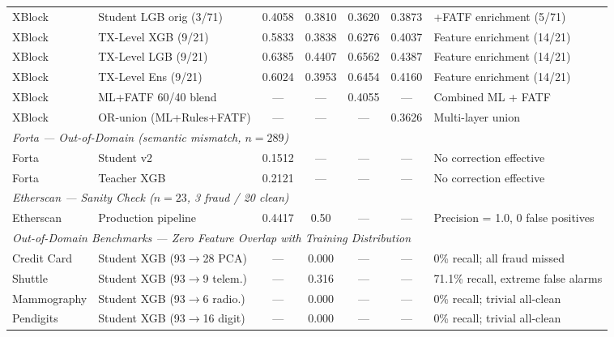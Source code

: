 \documentclass[journal]{IEEEtran}
\begin{document}
\begin{table}[!t]
\begin{tabular}{llccccl}
XBlock & Student LGB orig (3/71)       & 0.4058 & 0.3810 & 0.3620 & 0.3873 & +FATF enrichment (5/71) \\
XBlock & TX-Level XGB (9/21)           & 0.5833 & 0.3838 & 0.6276 & 0.4037 & Feature enrichment (14/21) \\
XBlock & TX-Level LGB (9/21)           & 0.6385 & 0.4407 & 0.6562 & 0.4387 & Feature enrichment (14/21) \\
XBlock & TX-Level Ens (9/21)           & 0.6024 & 0.3953 & 0.6454 & 0.4160 & Feature enrichment (14/21) \\
XBlock & ML+FATF 60/40 blend           & ---    & ---    & 0.4055 & ---    & Combined ML + FATF \\
XBlock & OR-union (ML+Rules+FATF)      & ---    & ---    & ---    & 0.3626 & Multi-layer union \\
\midrule
\multicolumn{7}{l}{\textit{Forta --- Out-of-Domain (semantic mismatch, $n = 289$)}} \\
Forta  & Student v2                    & 0.1512 & ---    & ---    & ---    & No correction effective \\
Forta  & Teacher XGB                  & 0.2121 & ---    & ---    & ---    & No correction effective \\
\midrule
\multicolumn{7}{l}{\textit{Etherscan --- Sanity Check ($n = 23$, 3 fraud / 20 clean)}} \\
Etherscan & Production pipeline        & 0.4417 & 0.50   & ---    & ---    & Precision = 1.0, 0 false positives \\
\midrule
\multicolumn{7}{l}{\textit{Out-of-Domain Benchmarks --- Zero Feature Overlap with Training Distribution}} \\
Credit Card & Student XGB (93$\to$28 PCA) & ---  & 0.000  & ---    & ---    & 0\% recall; all fraud missed \\
Shuttle     & Student XGB (93$\to$9 telem.)& ---  & 0.316  & ---    & ---    & 71.1\% recall, extreme false alarms \\
Mammography & Student XGB (93$\to$6 radio.)& ---  & 0.000  & ---    & ---    & 0\% recall; trivial all-clean \\
Pendigits   & Student XGB (93$\to$16 digit)& ---  & 0.000  & ---    & ---    & 0\% recall; trivial all-clean \\
\bottomrule
\end{tabular}
\end{table}
\end{document}
